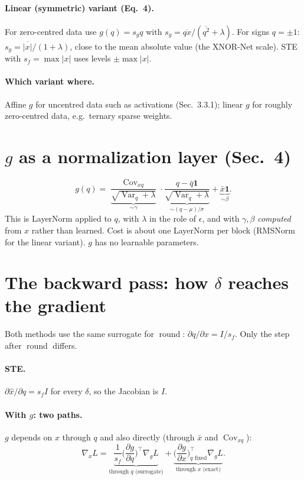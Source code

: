 \documentclass[11pt]{article}
\newcommand{\one}{\mathbf 1}
\newcommand{\Var}{\operatorname{Var}}
\newcommand{\Cov}{\operatorname{Cov}}
\newcommand{\rnd}{\operatorname{round}}
\begin{document}
\paragraph{Linear (symmetric) variant (Eq.~4).} For zero-centred data use $g(q)=s_gq$ with $s_g=\overline{qx}/(\overline{q^2}+\lambda)$. For signs $q=\pm1$: $s_g=\overline{|x|}/(1+\lambda)$, close to the mean absolute value (the XNOR-Net scale). STE with $s_f=\max|x|$ uses levels $\pm\max|x|$.

\paragraph{Which variant where.} Affine $g$ for uncentred data such as activations (Sec.~3.3.1); linear $g$ for roughly zero-centred data, e.g.\ ternary sparse weights.

\section{$g$ as a normalization layer (Sec.~4)}

\[
g(q)=\underbrace{\frac{\Cov_{xq}}{\sqrt{\Var_q+\lambda}}}_{\sim\gamma}\cdot
\underbrace{\frac{q-\bar q\one}{\sqrt{\Var_q+\lambda}}}_{\sim(q-\mu)/\sigma}
+\underbrace{\bar x\one}_{\sim\beta}.
\]
This is LayerNorm applied to $q$, with $\lambda$ in the role of $\epsilon$, and with $\gamma,\beta$ \emph{computed} from $x$ rather than learned. Cost is about one LayerNorm per block (RMSNorm for the linear variant). $g$ has no learnable parameters.

\section{The backward pass: how $\delta$ reaches the gradient}

Both methods use the same surrogate for $\rnd$: $\partial q/\partial x=I/s_f$. Only the step after $\rnd$ differs.

\paragraph{STE.} $\partial\hat x/\partial q=s_fI$ for every $\delta$, so the Jacobian is $I$.

\paragraph{With $g$: two paths.} $g$ depends on $x$ through $q$ and also directly (through $\bar x$ and $\Cov_{xq}$):
\[
\nabla_xL=\underbrace{\frac1{s_f}\Big(\frac{\partial g}{\partial q}\Big)^{\!\top}\nabla_gL}_{\text{through }q\text{ (surrogate)}}+\underbrace{\Big(\frac{\partial g}{\partial x}\Big)^{\!\top}_{q\text{ fixed}}\nabla_gL}_{\text{through }x\text{ (exact)}}.
\]
\end{document}
